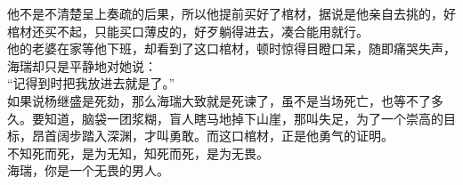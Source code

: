 \begin{multicols}{\theparacolNo}
他不是不清楚呈上奏疏的后果，所以他提前买好了棺材，据说是他亲自去挑的，好棺材还买不起，只能买口薄皮的，好歹躺得进去，凑合能用就行。\\

他的老婆在家等他下班，却看到了这口棺材，顿时惊得目瞪口呆，随即痛哭失声，海瑞却只是平静地对她说：\\

“记得到时把我放进去就是了。”\\

如果说杨继盛是死劾，那么海瑞大致就是死谏了，虽不是当场死亡，也等不了多久。要知道，脑袋一团浆糊，盲人瞎马地掉下山崖，那叫失足，为了一个崇高的目标，昂首阔步踏入深渊，才叫勇敢。而这口棺材，正是他勇气的证明。\\

不知死而死，是为无知，知死而死，是为无畏。\\

海瑞，你是一个无畏的男人。\\

\ifnum{}
	\end{multicols}
\fi
\newpage
